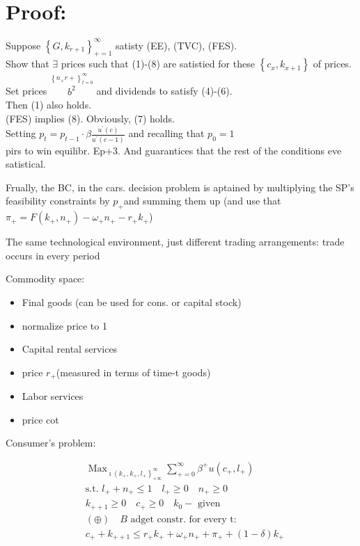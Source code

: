 \documentclass[10pt]{article}
\begin{document}
\section*{Proof:}
Suppose $\left\{G, k_{r+1}\right\}_{+=1}^{\infty}$ satisty (EE), (TVC), (FES).\\
Show that $\exists$ prices such that (1)-(8) are satistied for these $\left\{c_{x}, k_{x+1}\right\}$ of prices.\\
Set prices $\stackrel{\left\{n_{+} r+\right\}_{t=0}^{\infty}}{b^{2}}$ and dividends to satisfy (4)-(6).\\
Then (1) also holds.\\
(FES) implies (8). Obviously, (7) holds.\\
Setting $p_{t}=p_{t-1} \cdot \beta \frac{u^{\prime}(c)}{u^{\prime}(c-1)}$ and recalling that $p_{0}=1$\\
pirs to win equilibr. Ep+3. And guarantices that the rest of the conditions eve satistical.

Frually, the BC, in the cars. decision problem is aptained by multiplying the SP's feasibility constraints by $p_{+}$and summing them up (and use that $\pi_{+}=F\left(k_{+}, n_{+}\right)-\omega_{+} n_{+}-r_{+} k_{+}$)

The same technological environment, just different trading arrangements: trade occurs in every period

Commodity space:

\begin{itemize}
  \item Final goods (can be used for cons. or capital stock)
  \item normalize price to 1
  \item Capital rental services
  \item price $r_{+}$(measured in terms of time-t goods)
  \item Labor services
  \item price cot
\end{itemize}

Consumer's problem:

$$
\begin{aligned}
& \operatorname{Max}_{\imath\left(k_{+}, k_{+}, l_{+}\right\}_{+\infty}^{\infty}} \sum_{+=0}^{\infty} \beta^{+} u\left(c_{+}, l_{+}\right) \\
& \text {s.t. } l_{+}+n_{+} \leq 1 \quad l_{+} \geq 0 \quad n_{+} \geq 0 \\
& k_{++1} \geq 0 \quad c_{+} \geq 0 \quad k_{0}-\text { given } \\
& (\oplus) \quad B \text { adget constr. for every t: } \\
& c_{+}+k_{++1} \leq r_{+} k_{+}+\omega_{+} n_{+}+\pi_{+}+(1-\delta) k_{+}
\end{aligned}
$$
\end{document}
